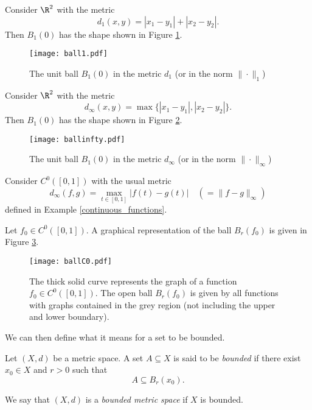 \np

\begin{example}
Consider $\R^2$ with the metric
\[
d_1(x,y) = |x_1 - y_1| + |x_2 - y_2|.
\]
Then $B_1(0)$ has the shape shown in Figure \ref{fig:ball1}.
\begin{figure}[ht]
\begin{center}
\texttt{[image: ball1.pdf]}
\caption{The unit ball $B_1(0)$ in the metric $d_1$ (or in the norm $\|\cdot\|_{1}$)}
\label{fig:ball1}
\end{center}
\end{figure}
\end{example}

\begin{example}
Consider $\R^2$ with the metric
\[
d_\infty(x,y) = \max\{|x_1 - y_1|,|x_2 - y_2|\}.
\]
Then $B_1(0)$ has the shape shown in Figure \ref{fig:ballinfty}.
\begin{figure}[ht]
\begin{center}
\texttt{[image: ballinfty.pdf]}
\caption{The unit ball $B_1(0)$ in the metric $d_\infty$ (or in the norm $\|\cdot\|_{\infty}$)}
\label{fig:ballinfty}
\end{center}
\end{figure}
\end{example}

\begin{example}
Consider $C^0([0,1])$ with the usual metric
\[
d_\infty(f,g) = \max_{t \in [0,1]} |f(t) - g(t)| \quad (=\|f-g\|_\infty)
\]
defined in Example \ref{continuous_functions}.

Let $f_0 \in C^0([0,1])$. A graphical representation of the ball $B_r(f_0)$ is given in Figure \ref{fig:ballC0}.
\begin{figure}[ht]
\begin{center}
\texttt{[image: ballC0.pdf]}
\caption{The thick solid curve represents the graph of a function $f_0 \in C^0([0,1])$. The open ball $B_r(f_0)$ is given by all functions with graphs contained in the grey region (not including the upper and lower boundary).}
\label{fig:ballC0}
\end{center}
\end{figure}
\end{example}


We can then define what it means for a set to be bounded.



\begin{definition}
Let $(X,d)$ be a metric space. A set $A\subseteq X$ is said to be \emph{bounded} if there exist $x_0\in X$ and $r>0$ such that 
$$
A\subseteq B_r(x_0).
$$ 

We say that $(X,d)$ is a \emph{bounded metric space} if $X$ is bounded.
\end{definition}


